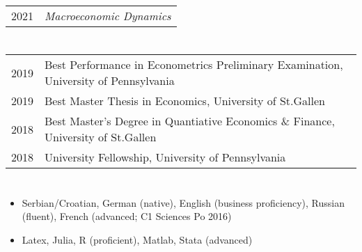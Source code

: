 \documentclass[letter,10pt]{article}
\newcommand{\spacebeforeitems}{\vspace*{8pt}}
\newcommand{\myEmph}[1]{#1}
\begin{document}
\section*{}

\begin{table}[h!]
	\begin{tabular}{p{2.5cm}p{15cm}}
		2021 	& \textit{Macroeconomic Dynamics} \\
	\end{tabular}
\end{table}

\newpage

\section*{}

\begin{table}[h!]
	\begin{tabular}{p{2.5cm}p{15cm}}
		2019 	& \myEmph{Best Performance in Econometrics Preliminary Examination,} University of Pennsylvania\\
		2019 	& \myEmph{Best Master Thesis in Economics,} University of St.Gallen\\
		2018  & \myEmph{Best Master's Degree in Quantiative Economics \& Finance,} University of St.Gallen\\
		2018  & \myEmph{University Fellowship,} University of Pennsylvania\\
	\end{tabular}
\end{table}



\section*{}

\spacebeforeitems

\begin{itemize}
	\item \myEmph{Serbian/Croatian, German} (native), \myEmph{English} (business proficiency), \myEmph{Russian} (fluent), \myEmph{French} (advanced; C1 Sciences Po 2016)
	\item \myEmph{Latex, Julia, R} (proficient), \myEmph{Matlab, Stata} (advanced)
\end{itemize}


\section*{}
\end{document}
